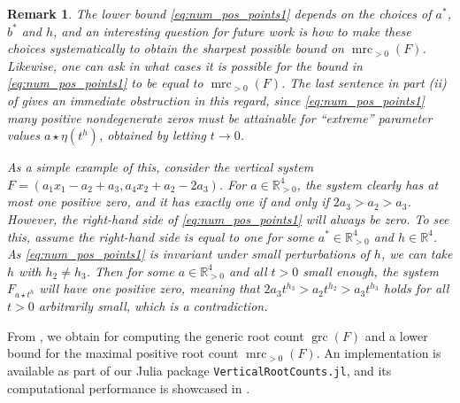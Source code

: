 \documentclass[11pt,reqno,a4paper]{amsart}
\numberwithin{equation}{section}
\theoremstyle{theoremstyle}
\theoremstyle{examplestyle}
\newtheorem{remark}[theorem]{Remark}
\newcommand{\RR}{\mathbb{R}}
\DeclareMathOperator{\grc}{grc}
\DeclareMathOperator{\mrc}{mrc}
\begin{document}
\begin{remark}\label{rem:unbounded_regions}
The lower bound \eqref{eq:num_pos_points1} depends on the choices of $a^*$, $b^*$ and $h$, and an interesting question for future work is how to make these choices systematically to obtain the sharpest possible bound on $\mrc_{>0}(F)$. Likewise, one can ask in what cases it is possible for the bound in \eqref{eq:num_pos_points1} to be equal to $\mrc_{>0}(F)$. The last sentence in part (ii) of  gives an immediate obstruction in this regard, since \eqref{eq:num_pos_points1} many positive nondegenerate zeros must be attainable for ``extreme'' parameter values $a\star \eta(t^h)$, obtained by letting $t\to 0$.


As a simple example of this, consider the vertical system 
$F=(a_1 x_1 - a_2  + a_3,  a_4 x_2 + a_2- 2a_3)$. For $a\in \RR^4_{>0}$, the system clearly has at most one positive zero, and it has exactly one if and only if $2a_3>a_2>a_3$.
However, the right-hand side of \eqref{eq:num_pos_points1} will always be zero. To see this, assume the right-hand side is equal to one for some $a^*\in \RR^4_{>0}$ and $h\in \RR^4$.
As \eqref{eq:num_pos_points1} is invariant under small  perturbations of $h$, we can take $h$ with $h_2\neq h_3$. 
Then for some $a\in\RR^4_{>0}$ and all $t>0$ small enough, the system $F_{a\star t^h}$ will have one positive zero, meaning that $2a_3t^{h_3} >a_2t^{h_2} >a_3t^{h_3}$ holds for all $t>0$ arbitrarily small, which is a contradiction. 
\end{remark} 

From , we obtain  for computing the generic root count $\grc(F)$ and a lower bound for the maximal positive root count $\mrc_{>0}(F)$. 
An implementation is available as part of our Julia package \texttt{VerticalRootCounts.jl}, and its computational performance is showcased in . 
\end{document}
